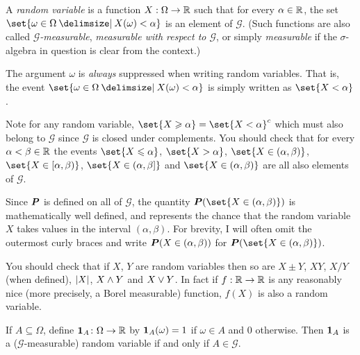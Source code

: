 \begin{definition}
  A \emph{random variable} is a function $X:\Omega \to \R$ such that for every $\alpha \in \R$, the set $\set{ \omega \in \Omega \st X(\omega) < \alpha }$ is an element of $\mathcal G$.
  (Such functions are also called \emph{$\mathcal G$-measurable}, \emph{measurable with respect to $\mathcal G$}, or simply \emph{measurable} if the $\sigma$-algebra in question is clear from the context.)
\end{definition}
\begin{remark}
  The argument $\omega$ is \emph{always} suppressed when writing random variables.
  That is, the event $\set{\omega \in \Omega \st X(\omega) < \alpha}$ is simply written as $\set{X < \alpha}$.
\end{remark}
\begin{remark}
  Note for any random variable, $\set{X \geq \alpha} = \set{X < \alpha}^c$ which must also belong to $\mathcal G$ since $\mathcal G$ is closed under complements.
  You should check that for every $\alpha < \beta \in \R$ the events $\set{X \leq \alpha}$, $\set{X > \alpha}$, $\set{X \in (\alpha, \beta)}$, $\set{X \in [\alpha, \beta)}$, $\set{X \in (\alpha, \beta]}$ and $\set{X \in (\alpha, \beta)}$ are all also elements of $\mathcal G$.

  Since $\P$ is defined on all of $\mathcal G$, the quantity $\P( \set{X \in (\alpha, \beta)})$ is mathematically well defined, and represents the chance that the random variable $X$ takes values in the interval $(\alpha, \beta)$.
  For brevity, I will often omit the outermost curly braces and write $\P(X \in (\alpha, \beta))$ for $\P(\set{X \in (\alpha, \beta)})$.
\end{remark}

\begin{remark}
  You should check that if $X$, $Y$ are random variables then so are $X \pm Y$, $XY$, $X/Y$ (when defined), $\abs{X}$, $X \varmin Y$ and $X \varmax Y$.
  In fact if $f: \R \to \R$ is any reasonably nice (more precisely, a Borel measurable) function, $f(X)$ is also a random variable.
\end{remark}

\begin{example}
  If $A \subseteq \Omega$, define $\one_A\colon \Omega \to \R$ by $\one_A(\omega) = 1$ if $\omega \in A$ and $0$ otherwise.
  Then $\one_A$ is a ($\mathcal G$-measurable) random variable if and only if $A \in \mathcal G$.
\end{example}

